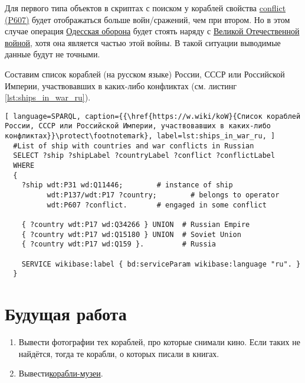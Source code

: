 Для первого типа объектов в скриптах с поиском у кораблей свойства \href{https://www.wikidata.org/wiki/Property:P607}{conflict (P607)} будет отображаться больше войн/сражений, чем при втором. Но в этом случае операция \href{https://ru.wikipedia.org/wiki/Одесская_оборона_(1941)}{Одесская оборона} будет стоять наряду с \href{https://ru.wikipedia.org/wiki/Великая_Отечественная_война}{Великой Отечественной войной}, хотя она является частью этой войны. В такой ситуации выводимые данные будут не точными.

Составим список кораблей (на русском языке) России, СССР или Российской Империи, участвовавших в каких-либо конфликтах (см. листинг \ref{lst:ships_in_war_ru}).

\begin{lstlisting}[ language=SPARQL, caption={{\href{https://w.wiki/koW}{Список кораблей России, СССР или Российской Империи, участвовавших в каких-либо конфликтах}}\protect\footnotemark}, label=lst:ships_in_war_ru, ]
  #List of ship with countries and war conflicts in Russian
  SELECT ?ship ?shipLabel ?countryLabel ?conflict ?conflictLabel
  WHERE
  {
    ?ship wdt:P31 wd:Q11446;        # instance of ship
          wdt:P137/wdt:P17 ?country;        # belongs to operator
          wdt:P607 ?conflict.       # engaged in some conflict
    
    { ?country wdt:P17 wd:Q34266 } UNION  # Russian Empire
    { ?country wdt:P17 wd:Q15180 } UNION  # Soviet Union
    { ?country wdt:P17 wd:Q159 }.         # Russia
    
    SERVICE wikibase:label { bd:serviceParam wikibase:language "ru". }
  }
\end{lstlisting}
  


\section{Будущая работа}

\begin{enumerate}
  \item Вывести фотографии тех кораблей, про которые снимали кино. Если таких не найдётся, тогда те корабли, о которых писали в книгах.
  \item Вывести\href{https://ru.wikipedia.org/wiki/Список_кораблей-музеев}{корабли-музеи}.
\end{enumerate}


